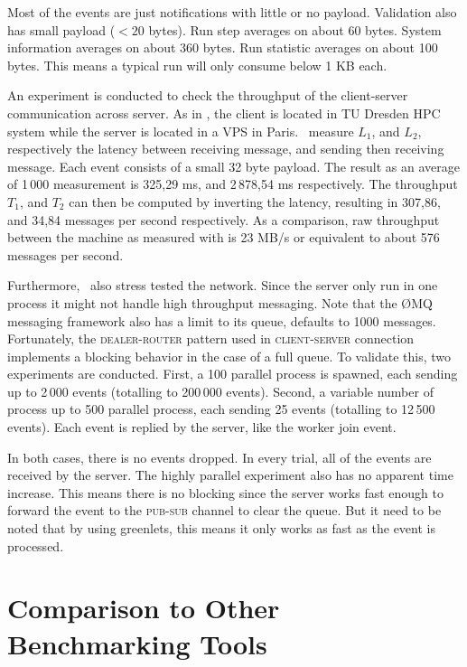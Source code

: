 Most of the events are just notifications with little or no payload.
Validation also has small payload ($< 20$ bytes).
Run step averages on about 60 bytes.
System information averages on about 360 bytes.
Run statistic averages on about 100 bytes.
This means a typical run will only consume below 1 KB each.

An experiment is conducted to check the throughput of the client-server communication across server.
As in , the client is located in TU Dresden HPC system while the server is located in a VPS in Paris.
\First~measure \(L_1\), and \(L_2\), respectively the latency between receiving message, and sending then receiving message.
Each event consists of a small 32 byte payload.
The result as an average of 1\,000 measurement is 325,29 ms, and 2\,878,54 ms respectively.
The throughput \(T_1\), and \(T_2\) can then be computed by inverting the latency, resulting in 307,86, and 34,84 messages per second respectively.
As a comparison, raw throughput between the machine as measured with  is 23 MB/s or equivalent to about 576 messages per second.

Furthermore, \first~also stress tested the network.
Since the server only run in one process it might not handle high throughput messaging.
Note that the \O MQ messaging framework also has a limit to its queue, defaults to 1000 messages.
Fortunately, the \textsc{dealer-router} pattern used in \textsc{client}-\textsc{server} connection implements a blocking behavior in the case of a full queue.
To validate this, two experiments are conducted.
First, a 100 parallel process is spawned, each sending up to 2\,000 events (totalling to 200\,000 events).
Second, a variable number of process up to 500 parallel process, each sending 25 events (totalling to 12\,500 events).
Each event is replied by the server, like the worker join event.

In both cases, there is no events dropped.
In every trial, all of the events are received by the server.
The highly parallel experiment also has no apparent time increase.
This means there is no blocking since the server works fast enough to forward the event to the \textsc{pub}-\textsc{sub} channel to clear the queue.
But it need to be noted that by using greenlets, this means it only works as fast as the event is processed.

\section{Comparison to Other Benchmarking Tools}
\label{sec:prior_works.method}

